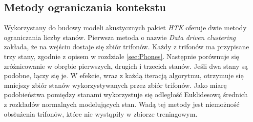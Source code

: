\documentclass[shortabstract, mgr]{iithesis}
\begin{document}
	\subsection{Metody ograniczania kontekstu}
	\label{sec:state_red}
	Wykorzystany do budowy modeli akustycznych pakiet \textit{HTK} oferuje dwie metody ograniczania liczby stanów. Pierwsza metoda o nazwie \textit{Data driven clustering} zakłada, że na wejściu dostaje się zbiór trifonów. Każdy z trifonów ma przypisane trzy stany, zgodnie z opisem w rozdziale \ref{sec:Phones}. Następnie porównuje się zróżnicowanie w obrębie pierwszych, drugich i trzecich stanów. Jeśli dwa stany są podobne, łączy się je. W efekcie, wraz z każdą iteracją algorytmu, otrzymuje się mniejszy zbiór stanów wykorzystywanych przez zbiór trifonów. Jako miarę podobieństwa pomiędzy stanami wykorzystuje się odległość Euklidesową średnich z rozkładów normalnych modelujących stan. Wadą tej metody jest niemożność obsłużenia trifonów, które nie wystąpiły w zbiorze treningowym.
	
\end{document}
